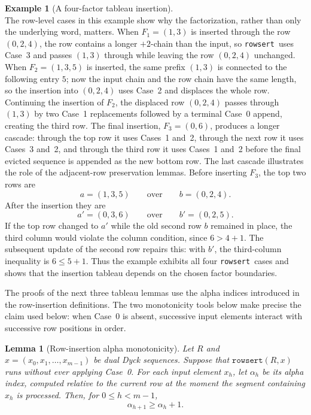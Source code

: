 \documentclass[11pt]{article}
\theoremstyle{plain}
\newtheorem{lemma}[theorem]{Lemma}
\theoremstyle{definition}
\newtheorem{example}[theorem]{Example}
\theoremstyle{remark}
\newcommand{\rowsert}{\texttt{rowsert}}
\begin{document}
\begin{example}[A four-factor tableau insertion]
\[\]
The row-level cases in this example show why the factorization, rather than only the
underlying word, matters.  When \(F_1=(1,3)\) is inserted through the row
\((0,2,4)\), the row contains a longer \(+2\)-chain than the input, so
\rowsert\ uses Case~3 and passes \((1,3)\) through while leaving the row
\((0,2,4)\) unchanged.  When \(F_2=(1,3,5)\) is inserted, the same prefix
\((1,3)\) is connected to the following entry \(5\); now the input chain and the
row chain have the same length, so the insertion into \((0,2,4)\) uses Case~2
and displaces the whole row.  Continuing the insertion of \(F_2\), the displaced
row \((0,2,4)\) passes through \((1,3)\) by two Case~1 replacements followed by
a terminal Case~0 append, creating the third row.
The final insertion, \(F_3=(0,6)\), produces a longer cascade: through the top
row it uses Cases~1 and~2, through the next row it uses Cases~3 and~2, and
through the third row it uses Cases~1 and~2 before the final evicted sequence is
appended as the new bottom row.  The last cascade illustrates the role of the
adjacent-row preservation lemmas.  Before inserting \(F_3\), the top two rows are
\[
  a=(1,3,5)
  \qquad\text{over}\qquad
  b=(0,2,4).
\]
After the insertion they are
\[
  a'=(0,3,6)
  \qquad\text{over}\qquad
  b'=(0,2,5).
\]
If the top row changed to \(a'\) while the old second row \(b\) remained in
place, the third column would violate the column condition, since
\(6>4+1\).  The subsequent update of the second row repairs this: with
\(b'\), the third-column inequality is \(6\le 5+1\).
Thus the example exhibits all four \rowsert\ cases and shows that the insertion
tableau depends on the chosen factor boundaries.
\end{example}
The proofs of the next three tableau lemmas use the alpha indices introduced in
the row-insertion definitions.  The two monotonicity tools below make precise
the claim used below: when Case~0 is absent, successive input elements
interact with successive row positions in order.
\begin{lemma}[Row-insertion alpha monotonicity]
\label{lem:rowsert-alpha-monotonicity}
Let \(R\) and \(x=(x_0,x_1,\ldots,x_{m-1})\) be dual Dyck sequences.  Suppose
that \(\rowsert(R,x)\) runs without ever applying Case~0.  For each input
element \(x_h\), let \(\alpha_h\) be its alpha index, computed relative to the
current row at the moment the segment containing \(x_h\) is processed.  Then,
for \(0\le h<m-1\),
\[
  \alpha_{h+1}\ge \alpha_h+1.
\]
\end{lemma}
\end{document}
